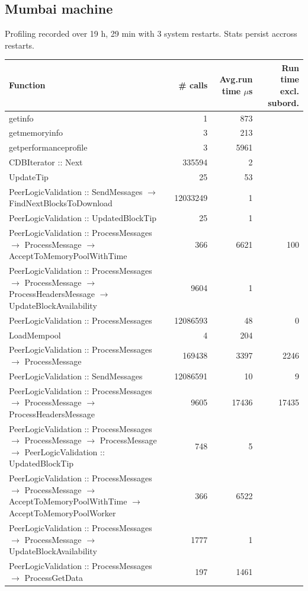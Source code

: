 \documentclass{article}
\begin{document}
\subsection{Mumbai machine}



Profiling recorded over 19 h, 29 min with 3 system restarts. Stats persist accross restarts.

\begin{longtable}{P{8cm}|r|r|r}
	Function&\# calls& Avg.run time $\mu$s& Run time excl. subord. \\\hline
	getinfo& 1& 873&\\\hline
	getmemoryinfo& 3& 213&\\\hline
	getperformanceprofile& 3& 5961&\\\hline
	CDBIterator :: Next& 335594& 2&\\\hline
	UpdateTip& 25& 53&\\\hline
	PeerLogicValidation :: SendMessages $\to$ FindNextBlocksToDownload& 12033249& 1&\\\hline
	PeerLogicValidation :: UpdatedBlockTip& 25& 1&\\\hline
	PeerLogicValidation :: ProcessMessages $\to$ ProcessMessage $\to$ AcceptToMemoryPoolWithTime& 366& 6621&100\\\hline
	PeerLogicValidation :: ProcessMessages $\to$ ProcessMessage $\to$ ProcessHeadersMessage $\to$ UpdateBlockAvailability& 9604& 1&\\\hline
	PeerLogicValidation :: ProcessMessages& 12086593& 48&0\\\hline
	LoadMempool& 4& 204&\\\hline
	PeerLogicValidation :: ProcessMessages $\to$ ProcessMessage& 169438& 3397&2246\\\hline
	PeerLogicValidation :: SendMessages& 12086591& 10&9\\\hline
	PeerLogicValidation :: ProcessMessages $\to$ ProcessMessage $\to$ ProcessHeadersMessage& 9605& 17436&17435\\\hline
	PeerLogicValidation :: ProcessMessages $\to$ ProcessMessage $\to$ ProcessMessage $\to$ PeerLogicValidation :: UpdatedBlockTip& 748& 5&\\\hline
	PeerLogicValidation :: ProcessMessages $\to$ ProcessMessage $\to$ AcceptToMemoryPoolWithTime $\to$ AcceptToMemoryPoolWorker& 366& 6522&\\\hline
	PeerLogicValidation :: ProcessMessages $\to$ ProcessMessage $\to$ UpdateBlockAvailability& 1777& 1&\\\hline
	PeerLogicValidation :: ProcessMessages $\to$ ProcessGetData& 197& 1461&\\\hline

\end{longtable}
\end{document}
